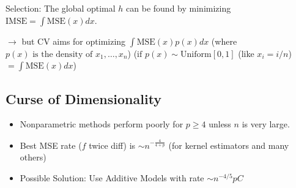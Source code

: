 Selection:
The global optimal $h$ can be found by minimizing $\text{IMSE} = \int \text{MSE}(x) dx$.

$\to$ but CV aims for optimizing $\int \text{MSE}(x)p(x)dx$
(where $p(x) \text{ is the density of } x_1, \dots, x_n$) ($\text{if } p(x) \sim \text{Uniform}[0,1]$ (like $x_i = i/n$) $= \int \text{MSE}(x) dx$)


\subsection{Curse of Dimensionality}
\begin{itemize}
    \item Nonparametric methods perform poorly for $p \ge 4$ unless $n$ is very large. 
    \item Best MSE rate ($f$ twice diff) is $\sim n^{-\frac{4}{4+p}}$ (for kernel estimators and many others)
    \item Possible Solution: Use Additive Models with rate $\sim n^{-4/5}pC$
\end{itemize}